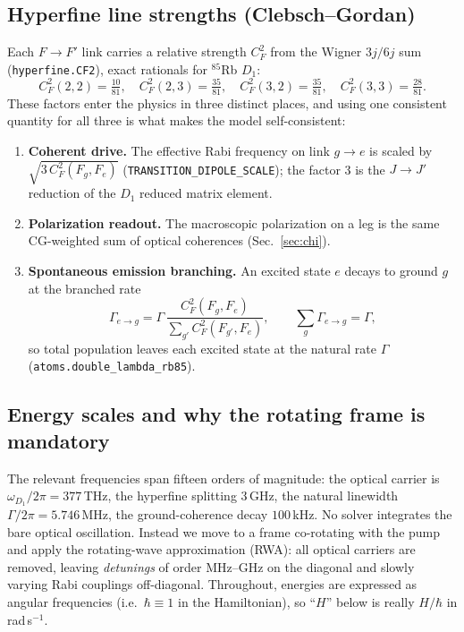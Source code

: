 \documentclass[11pt]{article}
\newcommand{\code}[1]{\texttt{#1}}
\begin{document}
\subsection{Hyperfine line strengths (Clebsch--Gordan)}

Each $F\!\to\!F'$ link carries a relative strength $C_F^2$ from the Wigner
$3j/6j$ sum (\code{hyperfine.CF2}), exact rationals for $^{85}$Rb $D_1$:
\begin{equation}
C_F^2(2,2)=\tfrac{10}{81},\quad
C_F^2(2,3)=\tfrac{35}{81},\quad
C_F^2(3,2)=\tfrac{35}{81},\quad
C_F^2(3,3)=\tfrac{28}{81}.
\label{eq:cf2}
\end{equation}
These factors enter the physics in three distinct places, and using one consistent
quantity for all three is what makes the model self-consistent:
\begin{enumerate}[leftmargin=2.2em]
  \item \textbf{Coherent drive.} The effective Rabi frequency on link $g\!\to\!e$
  is scaled by $\sqrt{3\,C_F^2(F_g,F_{e})}$ (\code{TRANSITION\_DIPOLE\_SCALE});
  the factor 3 is the $J\!\to\!J'$ reduction of the $D_1$ reduced matrix element.
  \item \textbf{Polarization readout.} The macroscopic polarization on a leg is the
  same CG-weighted sum of optical coherences (Sec.~\ref{sec:chi}).
  \item \textbf{Spontaneous emission branching.} An excited state $e$ decays to
  ground $g$ at the branched rate
  \begin{equation}
  \Gamma_{e\to g}=\Gamma\,\frac{C_F^2(F_g,F_{e})}{\sum_{g'}C_F^2(F_{g'},F_{e})},
  \qquad \sum_g \Gamma_{e\to g}=\Gamma,
  \label{eq:branching}
  \end{equation}
  so total population leaves each excited state at the natural rate $\Gamma$
  (\code{atoms.double\_lambda\_rb85}).
\end{enumerate}

\subsection{Energy scales and why the rotating frame is mandatory}

The relevant frequencies span fifteen orders of magnitude: the optical carrier is
$\omega_{D_1}/2\pi=377\,$THz, the hyperfine splitting $3\,$GHz, the natural
linewidth $\Gamma/2\pi=5.746\,$MHz, the ground-coherence decay $100\,$kHz. No
solver integrates the bare optical oscillation. Instead we move to a frame
co-rotating with the pump and apply the rotating-wave approximation (RWA): all
optical carriers are removed, leaving \emph{detunings} of order MHz--GHz on the
diagonal and slowly varying Rabi couplings off-diagonal. Throughout, energies are
expressed as angular frequencies (i.e.\ $\hbar\!\equiv\!1$ in the Hamiltonian), so
``$H$'' below is really $H/\hbar$ in rad\,s$^{-1}$.
\end{document}

